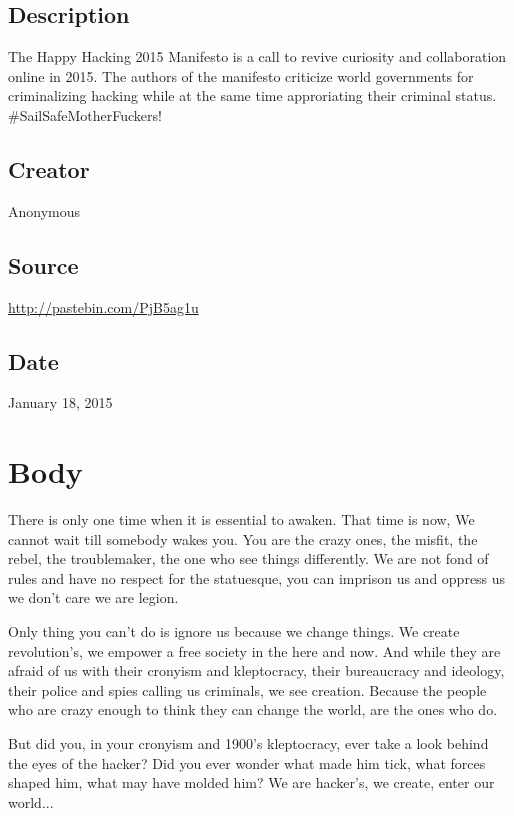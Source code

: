 \documentclass[letterpaper,12pt,english]{sphinxmanual}
\begin{document}
\subsection{Description}
\label{happy-hacking:description}
The Happy Hacking 2015 Manifesto is a call to revive curiosity and collaboration online in 2015. The authors of the manifesto criticize world governments for criminalizing hacking while at the same time approriating their criminal status. \#SailSafeMotherFuckers!


\subsection{Creator}
\label{happy-hacking:creator}
Anonymous


\subsection{Source}
\label{happy-hacking:source}
\href{http://pastebin.com/PjB5ag1u}{http://pastebin.com/PjB5ag1u}


\subsection{Date}
\label{happy-hacking:date}
January 18, 2015


\section{Body}
\label{happy-hacking:body}
There is only one time when it is essential to awaken. That time is now,
We cannot wait till somebody wakes you. You are the crazy ones, the misfit, the rebel,
the troublemaker, the one who see things differently.
We are not fond of rules and have no respect for the statuesque,
you can imprison us and oppress us we don't care we are legion.

Only thing you can’t do is ignore us because we change things. We create
revolution's, we empower a free society in the here and now.
And while they are afraid of us with their cronyism and kleptocracy,
their bureaucracy and ideology, their police and spies calling us criminals,
we see creation.
Because the people who are crazy enough to
think they can change the world,
are the ones who do.

But did you, in your cronyism and 1900's kleptocracy, ever
take a look behind the eyes of the hacker? Did you ever wonder what
made him tick, what forces shaped him, what may have molded him?
We are hacker's, we create, enter our world...
\end{document}

